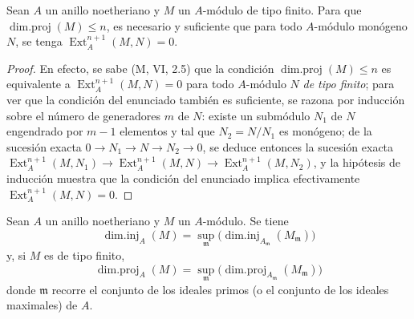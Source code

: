 \begin{lemma}[17.2.4]
\label{0.17.2.4-es}
Sean $A$ un anillo noetheriano y $M$ un $A$-módulo de tipo finito. Para que
$\operatorname{dim.proj}(M)\leq n$, es necesario y suficiente que para todo
$A$-módulo \textup{monógeno} $N$, se tenga $\operatorname{Ext}^{n+1}_A(M,N)=0$.
\end{lemma}

\begin{proof}
En efecto, se sabe (M, VI, 2.5) que la condición
$\operatorname{dim.proj}(M)\leq n$ es equivalente a
$\operatorname{Ext}^{n+1}_A(M,N)=0$ para todo $A$-módulo $N$ \emph{de tipo
finito}; para ver que la condición del enunciado también es suficiente, se
razona por inducción sobre el número de generadores $m$ de $N$: existe un
submódulo $N_1$ de $N$ engendrado por $m-1$ elementos y tal que
$N_2=N/N_1$ es monógeno; de la sucesión exacta
$0\longrightarrow N_1\longrightarrow N\longrightarrow N_2\longrightarrow0$,
se deduce entonces la sucesión exacta
$\operatorname{Ext}^{n+1}_A(M,N_1)\longrightarrow
\operatorname{Ext}^{n+1}_A(M,N)\longrightarrow
\operatorname{Ext}^{n+1}_A(M,N_2)$, y la hipótesis de inducción muestra que la
condición del enunciado implica efectivamente $\operatorname{Ext}^{n+1}_A(M,N)=0$.
\end{proof}

\begin{corollary}[17.2.5]
\label{0.17.2.5-es}
Sean $A$ un anillo noetheriano y $M$ un $A$-módulo. Se tiene
\begin{equation}
\label{0.17.2.5.1-es}
\tag{17.2.5.1}
  \operatorname{dim.inj}_A(M)
  =\sup_{\mathfrak{m}}
  \bigl(\operatorname{dim.inj}_{A_{\mathfrak{m}}}(M_{\mathfrak{m}})\bigr)
\end{equation}
y, si $M$ es de tipo finito,
\begin{equation}
\label{0.17.2.5.2-es}
\tag{17.2.5.2}
  \operatorname{dim.proj}_A(M)
  =\sup_{\mathfrak{m}}
  \bigl(\operatorname{dim.proj}_{A_{\mathfrak{m}}}(M_{\mathfrak{m}})\bigr)
\end{equation}
donde $\mathfrak{m}$ recorre el conjunto de los ideales primos (o el conjunto de los
ideales maximales) de $A$.
\end{corollary}

